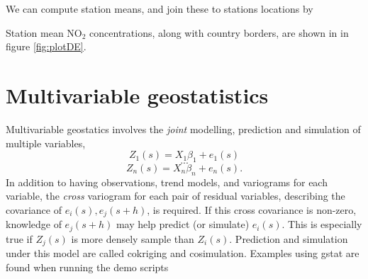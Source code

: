 \documentclass[]{book}
\newenvironment{Shaded}{\begin{snugshade}}{\end{snugshade}}
\newcommand{\CommentTok}[1]{\textcolor[rgb]{0.56,0.35,0.01}{\textit{#1}}}
\newcommand{\DataTypeTok}[1]{\textcolor[rgb]{0.13,0.29,0.53}{#1}}
\newcommand{\DecValTok}[1]{\textcolor[rgb]{0.00,0.00,0.81}{#1}}
\newcommand{\KeywordTok}[1]{\textcolor[rgb]{0.13,0.29,0.53}{\textbf{#1}}}
\newcommand{\NormalTok}[1]{#1}
\newcommand{\OperatorTok}[1]{\textcolor[rgb]{0.81,0.36,0.00}{\textbf{#1}}}
\newcommand{\OtherTok}[1]{\textcolor[rgb]{0.56,0.35,0.01}{#1}}
\newcommand{\StringTok}[1]{\textcolor[rgb]{0.31,0.60,0.02}{#1}}
\begin{document}
\begin{Shaded}
\end{Shaded}

We can compute station means, and join these to stations locations by

\begin{Shaded}
\end{Shaded}

Station mean NO\(_2\) concentrations, along with country borders, are shown in in figure \ref{fig:plotDE}.

\hypertarget{cokriging}{%
\section{Multivariable geostatistics}\label{cokriging}}

Multivariable geostatics involves the \emph{joint} modelling, prediction
and simulation of multiple variables,
\[Z_1(s) = X_1 \beta_1 + e_1(s)\]
\[...\]
\[Z_n(s) = X_n \beta_n + e_n(s).\]
In addition to having observations, trend models, and variograms
for each variable, the \emph{cross} variogram for each pair of residual
variables, describing the covariance of \(e_i(s), e_j(s+h)\),
is required. If this cross covariance is non-zero, knowledge of
\(e_j(s+h)\) may help predict (or simulate) \(e_i(s)\). This is
especially true if \(Z_j(s)\) is more densely sample than \(Z_i(s)\).
Prediction and simulation under this model are called cokriging
and cosimulation. Examples using gstat are found when running the
demo scripts
\end{document}
